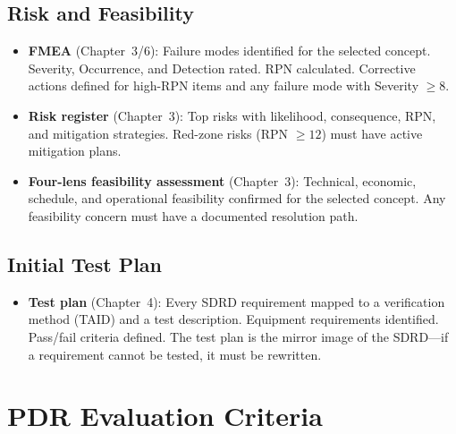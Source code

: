 \documentclass[11pt,letterpaper,twoside,openany]{book}
\begin{document}
\subsection{Risk and Feasibility}

\begin{itemize}[leftmargin=1.5em]
\item \textbf{FMEA} (Chapter~3/6): Failure modes identified for the selected concept. Severity, Occurrence, and Detection rated. RPN calculated. Corrective actions defined for high-RPN items and any failure mode with Severity $\geq 8$.
\item \textbf{Risk register} (Chapter~3): Top risks with likelihood, consequence, RPN, and mitigation strategies. Red-zone risks (RPN $\geq 12$) must have active mitigation plans.
\item \textbf{Four-lens feasibility assessment} (Chapter~3): Technical, economic, schedule, and operational feasibility confirmed for the selected concept. Any feasibility concern must have a documented resolution path.
\end{itemize}

\subsection{Initial Test Plan}

\begin{itemize}[leftmargin=1.5em]
\item \textbf{Test plan} (Chapter~4): Every SDRD requirement mapped to a verification method (TAID) and a test description. Equipment requirements identified. Pass/fail criteria defined. The test plan is the mirror image of the SDRD---if a requirement cannot be tested, it must be rewritten.
\end{itemize}

\FloatBarrier
\section{PDR Evaluation Criteria}
\end{document}
